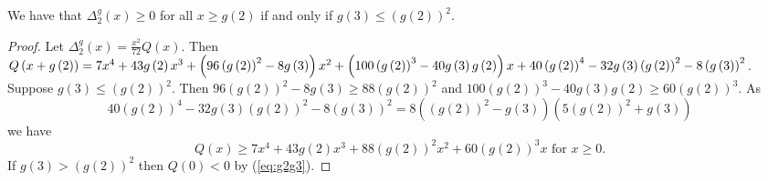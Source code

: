 \documentclass[10pt,a4paper]{amsart}
\begin{document}
\begin{lemma}
We have that
$\Delta _{2}^{g}\left( x\right) \geq 0$
for all $x\geq g\left( 2\right) $ if and only if
$g\left( 3\right) \leq
\left( g\left( 2\right) \right) ^{2}$.
\end{lemma}

\begin{proof}
Let $\Delta _{2}^{g}\left( x\right) =\frac{x^{2}}{72}Q\left( x\right) $.
Then
$Q\left( x+g\left( 2\right) \right) =7\*x^4
 + 43\*g\left( 2\right) \*x^3
 + \left(96\*\left( g\left( 2\right) \right) ^2
 - 8\*g\left( 3\right) \right) \*x^2
 + \left(100\*\left( g\left( 2\right) \right) ^3
 - 40\*g\left( 3\right) \*g\left( 2\right) \right) \*x
 + 40\*\left( g\left( 2\right) \right) ^4
 - 32\*g\left( 3\right) \*\left( g\left( 2\right) \right) ^2
 - 8\*\left( g\left( 3\right) \right) ^2
 $.
Suppose
$g\left( 3\right)
\leq \left( g\left( 2\right) \right) ^{2}$.
Then
$96\left( g\left( 2\right) \right) ^{2}-8g\left( 3\right) \geq 88
\left( g\left( 2\right) \right) ^{2}$
and
$100
\left( g\left( 2\right) \right) ^{3}-
40g\left( 3\right) g\left( 2\right) \geq 60\left( g\left( 2\right) \right) ^{3}$.
As
\begin{equation}
40\left( g\left( 2\right) \right) ^{4}-32g\left( 3\right) \left( g\left( 2\right) \right) ^{2}-8\left( g\left( 3\right) \right) ^{2}
=8\left( \left( g\left( 2\right) \right) ^{2}
-g\left( 3\right) \right) 
\left( 5\left( g\left( 2\right) \right) ^{2}
+g\left( 3\right) \right) \label{eq:g2g3}
\end{equation}
we have
$$Q
\left( x\right) \geq
7x^{4}+43
g\left( 2\right) x^{3}+88
\left( g\left( 2\right) \right) ^{2}x^{2}+60
\left( g\left( 2\right) \right) ^{
3}x \text{ for }x\geq 0. $$
If $g\left( 3\right) >\left( g\left( 2\right) \right) ^{2}$ then
$Q\left( 0\right) <0$ by (\ref{eq:g2g3}).
\end{proof}
\end{document}
